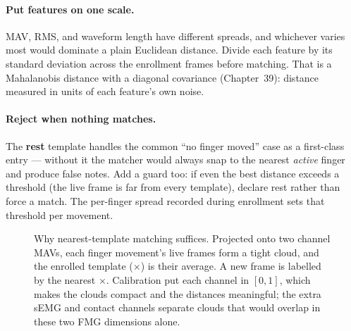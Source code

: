 \paragraph{Put features on one scale.} MAV, RMS, and waveform length have
different spreads, and whichever varies most would dominate a plain Euclidean
distance. Divide each feature by its standard deviation across the enrollment
frames before matching. That is a Mahalanobis distance with a diagonal covariance
(Chapter~39): distance measured in units of each feature's own noise.

\paragraph{Reject when nothing matches.} The \textbf{rest} template handles the
common ``no finger moved'' case as a first-class entry --- without it the matcher
would always snap to the nearest \emph{active} finger and produce false notes. Add
a guard too: if even the best distance exceeds a threshold (the live frame is far
from every template), declare rest rather than force a match. The per-finger
spread recorded during enrollment sets that threshold per movement.

\begin{figure}[H]
\centering
{}
\caption{Why nearest-template matching suffices. Projected onto two channel MAVs,
each finger movement's live frames form a tight cloud, and the enrolled template
($\times$) is their average. A new frame is labelled by the nearest
$\times$. Calibration put each channel in $[0,1]$, which makes the clouds compact
and the distances meaningful; the extra sEMG and contact channels separate clouds
that would overlap in these two FMG dimensions alone.}
\label{ch41:fig-clusters}
\end{figure}

